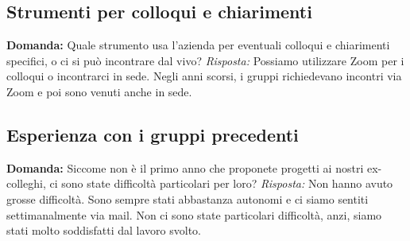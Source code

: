 \documentclass{article}
\begin{document}
\subsection{Strumenti per colloqui e chiarimenti}
\textbf{Domanda:} Quale strumento usa l'azienda per eventuali colloqui e chiarimenti specifici, o ci si può incontrare dal vivo? \newline
\textit{Risposta:} Possiamo utilizzare Zoom per i colloqui o incontrarci in sede. Negli anni scorsi, i gruppi richiedevano incontri via Zoom e poi sono venuti anche in sede.

\subsection{Esperienza con i gruppi precedenti}
\textbf{Domanda:} Siccome non è il primo anno che proponete progetti ai nostri ex-colleghi, ci sono state difficoltà particolari per loro? \newline
\textit{Risposta:} Non hanno avuto grosse difficoltà. Sono sempre stati abbastanza autonomi e ci siamo sentiti settimanalmente via mail. Non ci sono state particolari difficoltà, anzi, siamo stati molto soddisfatti dal lavoro svolto.
\end{document}
